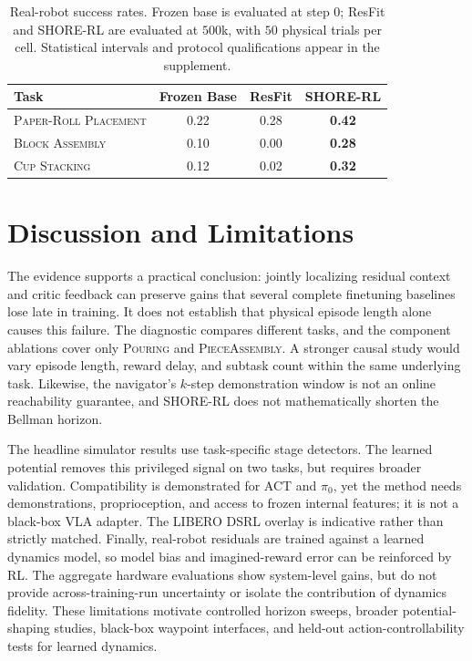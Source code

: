 \documentclass[letterpaper]{article} %
\begin{document}
\begin{table}[!t]
\centering\small\setlength{\tabcolsep}{4pt}
\begin{tabular}{@{}lccc@{}}
\toprule
Task & Frozen Base & ResFit & \textbf{SHORE-RL} \\
\midrule
\textsc{Paper-Roll Placement} & 0.22 & 0.28 & \textbf{0.42} \\
\textsc{Block Assembly}       & 0.10 & 0.00 & \textbf{0.28} \\
\textsc{Cup Stacking}         & 0.12 & 0.02 & \textbf{0.32} \\
\bottomrule
\end{tabular}
\caption{Real-robot success rates. Frozen base is evaluated at step $0$;
ResFit and SHORE-RL are evaluated at $500$k, with $50$ physical trials per
cell. Statistical intervals and protocol qualifications appear in the
supplement.}
\label{tab:realrobot}
\end{table}

\section{Discussion and Limitations}
The evidence supports a practical conclusion: jointly localizing residual
context and critic feedback can preserve gains that several complete
finetuning baselines lose late in training. It does not establish that
physical episode length alone causes this failure. The diagnostic compares
different tasks, and the component ablations cover only \textsc{Pouring} and
\textsc{PieceAssembly}. A stronger causal study would vary episode length,
reward delay, and subtask count within the same underlying task. Likewise,
the navigator's $k$-step demonstration window is not an online reachability
guarantee, and SHORE-RL does not mathematically shorten the Bellman horizon.

The headline simulator results use task-specific stage detectors. The learned
potential removes this privileged signal on two tasks, but requires broader
validation. Compatibility is demonstrated for ACT and $\pi_0$, yet the method
needs demonstrations, proprioception, and access to frozen internal features;
it is not a black-box VLA adapter. The LIBERO DSRL overlay is indicative rather
than strictly matched. Finally, real-robot residuals are trained against a
learned dynamics model, so model bias and imagined-reward error can be
reinforced by RL. The aggregate hardware evaluations show system-level gains,
but do not provide across-training-run uncertainty or isolate the contribution
of dynamics fidelity. These limitations motivate controlled horizon sweeps,
broader potential-shaping studies, black-box waypoint interfaces, and
held-out action-controllability tests for learned dynamics.
\end{document}
